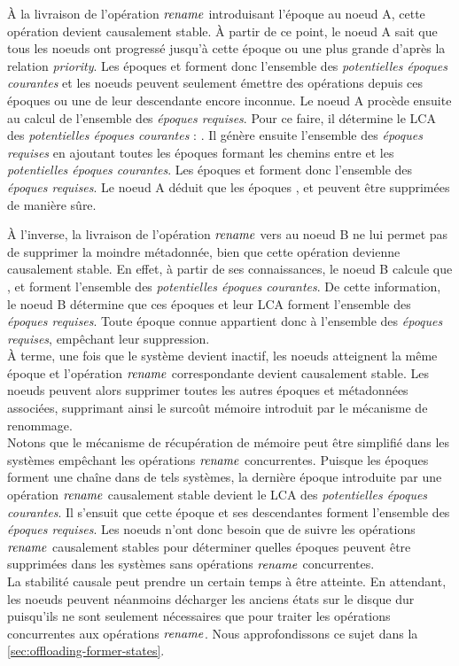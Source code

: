 À la livraison de l'opération $\mathit{rename}$ introduisant l'époque  au noeud A, cette opération devient causalement stable.
À partir de ce point, le noeud A sait que tous les noeuds ont progressé jusqu'à cette époque ou une plus grande d'après la relation \emph{priority}.
Les époques  et  forment donc l'ensemble des \emph{potentielles époques courantes} et les noeuds peuvent seulement émettre des opérations depuis ces époques ou une de leur descendante encore inconnue.
Le noeud A procède ensuite au calcul de l'ensemble des \emph{époques requises}.
Pour ce faire, il détermine le \ac{LCA} des \emph{potentielles époques courantes} : .
Il génère ensuite l'ensemble des \emph{époques requises} en ajoutant toutes les époques formant les chemins entre  et les \emph{potentielles époques courantes}.
Les époques  et  forment donc l'ensemble des \emph{époques requises}.
Le noeud A déduit que les époques ,  et  peuvent être supprimées de manière sûre.

À l'inverse, la livraison de l'opération $\mathit{rename}$ vers  au noeud B ne lui permet pas de supprimer la moindre métadonnée, bien que cette opération devienne causalement stable.
En effet, à partir de ses connaissances, le noeud B calcule que ,  et  forment l'ensemble des \emph{potentielles époques courantes}.
De cette information, le noeud B détermine que ces époques et leur \ac{LCA} forment l'ensemble des \emph{époques requises}.
Toute époque connue appartient donc à l'ensemble des \emph{époques requises}, empêchant leur suppression.\\

À terme, une fois que le système devient inactif, les noeuds atteignent la même époque et l'opération $\mathit{rename}$ correspondante devient causalement stable.
Les noeuds peuvent alors supprimer toutes les autres époques et métadonnées associées, supprimant ainsi le surcoût mémoire introduit par le mécanisme de renommage.\\

Notons que le mécanisme de récupération de mémoire peut être simplifié dans les systèmes empêchant les opérations $\mathit{rename}$ concurrentes.
Puisque les époques forment une chaîne dans de tels systèmes, la dernière époque introduite par une opération $\mathit{rename}$ causalement stable devient le \ac{LCA} des \emph{potentielles époques courantes}.
Il s'ensuit que cette époque et ses descendantes forment l'ensemble des \emph{époques requises}.
Les noeuds n'ont donc besoin que de suivre les opérations $\mathit{rename}$ causalement stables pour déterminer quelles époques peuvent être supprimées dans les systèmes sans opérations $\mathit{rename}$ concurrentes.\\

La stabilité causale peut prendre un certain temps à être atteinte.
En attendant, les noeuds peuvent néanmoins décharger les anciens états sur le disque dur puisqu'ils ne sont seulement nécessaires que pour traiter les opérations concurrentes aux opérations $\mathit{rename}$.
Nous approfondissons ce sujet dans la \autoref{sec:offloading-former-states}.
